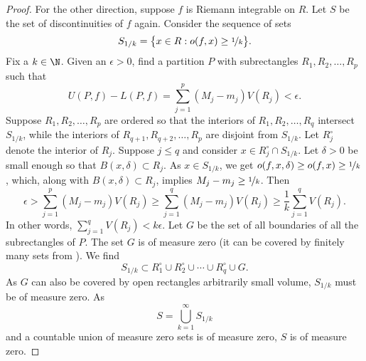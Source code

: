 \begin{proof}
\medskip

\pagebreak[2]
For the other direction, suppose $f$ is Riemann integrable
on $R$.
Let $S$ be the set of discontinuities of $f$ again.  Consider
the sequence of sets
\begin{equation*}
S_{1/k} = \bigl\{ x \in R : o(f,x) \geq \nicefrac{1}{k} \bigr\}.
\end{equation*}
Fix a $k \in \N$.
Given an $\epsilon > 0$, find a partition $P$ with subrectangles
$R_1,R_2,\ldots,R_p$ such that
\begin{equation*}
U(P,f)-L(P,f) =
\sum_{j=1}^p (M_j-m_j) V(R_j)
< \epsilon .
\end{equation*}
Suppose $R_1,R_2,\ldots,R_p$ are ordered so that
the interiors of $R_1,R_2,\ldots,R_{q}$ intersect $S_{1/k}$,
while the interiors of $R_{q+1},R_{q+2},\ldots,R_p$
are disjoint from $S_{1/k}$.
Let $R_j^\circ$ denote the interior of $R_j$.
Suppose $j \leq q$ and consider
$x \in R_j^\circ \cap S_{1/k}$.
Let $\delta > 0$ be small enough so that $B(x,\delta) \subset R_j$.
As $x \in S_{1/k}$, we get $o(f,x,\delta) \geq o(f,x) \geq \nicefrac{1}{k}$,
which, along with $B(x,\delta) \subset R_j$, implies
$M_j-m_j \geq \nicefrac{1}{k}$.
Then
\begin{equation*}
\epsilon >
\sum_{j=1}^p (M_j-m_j) V(R_j)
\geq
\sum_{j=1}^q (M_j-m_j) V(R_j)
\geq
\frac{1}{k}
\sum_{j=1}^q V(R_j) .
\end{equation*}
In other words,
$\sum_{j=1}^q V(R_j) < k \epsilon$.
Let $G$ be the set of all boundaries of all the subrectangles
of $P$.  The set $G$ is of measure zero (it can be covered by
finitely many sets from ).
We find
\begin{equation*}
S_{1/k} \subset R_1^\circ \cup R_2^\circ \cup \cdots \cup R_q^\circ \cup G .
\end{equation*}
As $G$ can also be covered by open rectangles arbitrarily small volume,
$S_{1/k}$ must be of measure zero.  As
\begin{equation*}
S = \bigcup_{k=1}^\infty S_{1/k}
\end{equation*}
and a countable union of measure zero sets is of measure zero, 
$S$ is of measure zero.
\end{proof}

